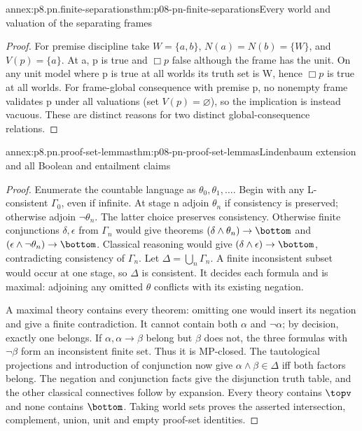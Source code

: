 \begin{annexitem}{annex:p8.pn.finite-separations}{thm:p08-pn-finite-separations}{Every world and valuation of the separating frames}
\begin{proof}
For premise discipline take \(W=\{a,b\}\),
\(N(a)=N(b)=\{W\}\), and \(V(p)=\{a\}\).
At a, p is true and \(\Box p\) false although the frame has
the unit. On any unit model where p is true at all worlds its
truth set is W, hence \(\Box p\) is true at all worlds. For
frame-global consequence with premise p, no nonempty frame
validates p under all valuations (set \(V(p)=\varnothing\)),
so the implication is instead vacuous. These are distinct reasons
for two distinct global-consequence relations.
\end{proof}
\end{annexitem}

\begin{annexitem}{annex:p8.pn.proof-set-lemmas}{thm:p08-pn-proof-set-lemmas}{Lindenbaum extension and all Boolean and entailment claims}
\begin{proof}
Enumerate the countable language as \(\theta_0,\theta_1,\ldots\).
Begin with any L-consistent \(\Gamma_0\), even if infinite.
At stage n adjoin \(\theta_n\) if consistency is preserved;
otherwise adjoin \(\neg\theta_n\). The latter choice preserves
consistency. Otherwise finite conjunctions \(\delta,\epsilon\)
from \(\Gamma_n\) would give theorems
\((\delta\land\theta_n)\to\bottom\) and
\((\epsilon\land\neg\theta_n)\to\bottom\).
Classical reasoning would give
\((\delta\land\epsilon)\to\bottom\), contradicting
consistency of \(\Gamma_n\). Let \(\Delta=\bigcup_n\Gamma_n\).
A finite inconsistent subset would occur at one stage, so
\(\Delta\) is consistent. It decides each formula and is maximal:
adjoining any omitted \(\theta\) conflicts with its existing negation.

A maximal theory contains every theorem: omitting one would
insert its negation and give a finite contradiction. It cannot
contain both \(\alpha\) and \(\neg\alpha\); by decision,
exactly one belongs. If \(\alpha,\alpha\to\beta\) belong
but \(\beta\) does not, the three formulas with
\(\neg\beta\) form an inconsistent finite set. Thus it is
MP-closed. The tautological projections and introduction of
conjunction now give
\(\alpha\land\beta\in\Delta\) iff both factors belong.
The negation and conjunction facts give the disjunction truth
table, and the other classical connectives follow by expansion.
Every theory contains \(\topv\) and none contains \(\bottom\).
Taking world sets proves the asserted intersection, complement,
union, unit and empty proof-set identities.


\end{proof}
\end{annexitem}
